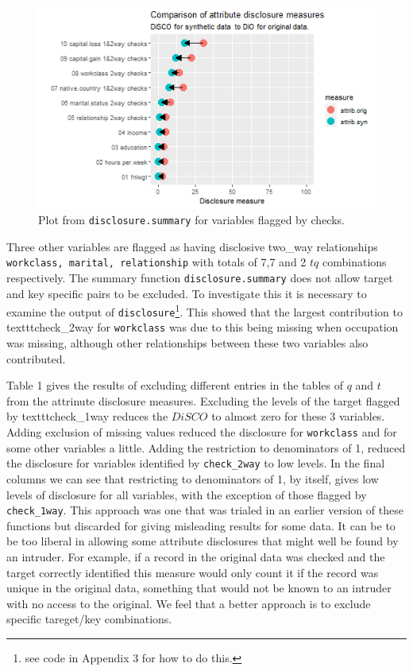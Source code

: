 \documentclass[12pt]{article}
\begin{document}
\begin{figure}[h]
\centering
\includegraphics[width=1\linewidth]{fig3dis.png}
\caption{Plot from \texttt{disclosure.summary} for variables flagged by checks.}
\label{fig:f3}
\end{figure}
Three other variables are flagged as having disclosive two\_way relationships \texttt{workclass, marital, relationship} with totals of 7,7 and 2 $tq$ combinations respectively. The summary function \texttt{disclosure.summary} does not allow target and key specific pairs to be excluded. To
investigate this it is necessary to examine the output of \texttt{disclosure}\footnote{see code in Appendix 3 for how to do this.}. This showed that 
the largest contribution to texttt{check\_2way} for \texttt{workclass} was due to this being missing when occupation was missing, although other
relationships between these two variables also contributed. 


Table 1 gives the results of excluding different entries in the tables of $q$ and $t$ from the attrinute disclosure measures.
Excluding the levels of the target flagged by texttt{check\_1way} reduces the $DiSCO$ to almost zero for these 3 variables.
Adding exclusion of missing values reduced the disclosure for \texttt{workclass} and for some other variables a little. 
Adding the restriction to denominators of 1, reduced the disclosure for variables identified by \texttt{check\_2way} to low 
levels. In the final columns we can see that restricting to denominators of 1, by itself, gives low levels of disclosure for
all variables, with the exception of those flagged by \texttt{check\_1way}. This approach was one that was trialed in an earlier 
version of these functions but discarded for giving misleading results for some data. It can be to be too liberal in allowing some attribute disclosures that might well be found by an intruder. For example, if a record in the original data was checked and the target correctly identified
this measure would only count it if the record was unique in the original data, something that would not be known
to an intruder with no access to the original. We feel that a better approach is to exclude specific tareget/key combinations.
\end{document}
